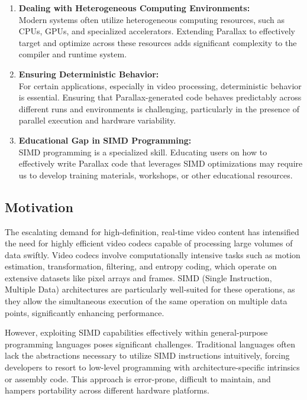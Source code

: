 \documentclass[12pt,a4paper]{article}
\begin{document}
\begin{enumerate}
    \item \textbf{Dealing with Heterogeneous Computing Environments:} \\
    Modern systems often utilize heterogeneous computing resources, such as CPUs, GPUs, and specialized accelerators. Extending Parallax to effectively target and optimize across these resources adds significant complexity to the compiler and runtime system.

    \item \textbf{Ensuring Deterministic Behavior:} \\
    For certain applications, especially in video processing, deterministic behavior is essential. Ensuring that Parallax-generated code behaves predictably across different runs and environments is challenging, particularly in the presence of parallel execution and hardware variability.

    \item \textbf{Educational Gap in SIMD Programming:} \\
    SIMD programming is a specialized skill. Educating users on how to effectively write Parallax code that leverages SIMD optimizations may require us to develop training materials, workshops, or other educational resources.

\end{enumerate}



\subsection{Motivation}

The escalating demand for high-definition, real-time video content has intensified the need for highly efficient video codecs capable of processing large volumes of data swiftly. Video codecs involve computationally intensive tasks such as motion estimation, transformation, filtering, and entropy coding, which operate on extensive datasets like pixel arrays and frames. SIMD (Single Instruction, Multiple Data) architectures are particularly well-suited for these operations, as they allow the simultaneous execution of the same operation on multiple data points, significantly enhancing performance.

However, exploiting SIMD capabilities effectively within general-purpose programming languages poses significant challenges. Traditional languages often lack the abstractions necessary to utilize SIMD instructions intuitively, forcing developers to resort to low-level programming with architecture-specific intrinsics or assembly code. This approach is error-prone, difficult to maintain, and hampers portability across different hardware platforms.
\end{document}
